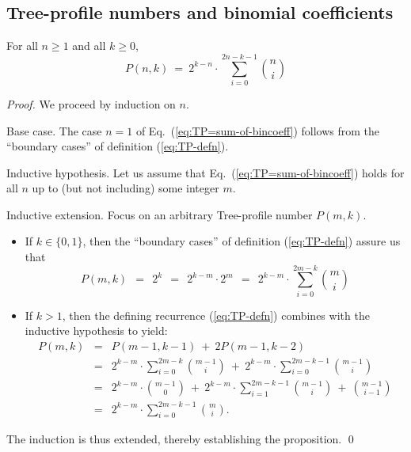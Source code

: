 \subsection{Tree-profile numbers and binomial coefficients}

\begin{prop}
\label{thm:TP=sum-of-bincoeff}
For all $n \geq 1$ and all $k \geq 0$,
\begin{equation}
\label{eq:TP=sum-of-bincoeff}
P(n,k) \ = \ 2^{k-n} \cdot \sum_{i=0}^{2n-k-1} {n \choose i}
\end{equation}
\end{prop}

\begin{proof}
We proceed by induction on $n$.

\medskip

\noindent
{\sf Base case.}
The case $n=1$ of Eq.~(\ref{eq:TP=sum-of-bincoeff}) follows from the ``boundary cases'' of definition (\ref{eq:TP-defn}).

\medskip

\noindent
{\sf Inductive hypothesis.}
Let us assume that Eq.~(\ref{eq:TP=sum-of-bincoeff}) holds for all $n$ up to (but not including) some integer $m$.  

\noindent
{\sf Inductive extension}.
Focus on an arbitrary Tree-profile number $P(m,k)$.
\begin{itemize}
\item
If $k \in \{0,1\}$, then the ``boundary cases'' of definition (\ref{eq:TP-defn}) assure us that
\[
P(m,k) \ \ = \ \ 2^k \ \ = \ \ 2^{k-m} \cdot 2^m \ \ = \ \  2^{k-m} \cdot \sum_{i=0}^{2m-k} {m \choose i}
\]

\item
If $k > 1$, then the defining recurrence (\ref{eq:TP-defn}) combines with the inductive hypothesis to yield:
\begin{eqnarray*}
\nonumber
P(m, k) & = &
   P(m-1, k-1) \ + \ 2 P(m-1, k-2) \\
        & = &
   2^{k-m} \cdot \sum_{i=0}^{2m-k} {m-1 \choose i}
   \ + \
   2^{k-m} \cdot \sum_{i=0}^{2m-k-1} {m-1 \choose i} \\
        & = &
   2^{k-m} \cdot {m-1 \choose 0}
   \ + \
   2^{k-m} \cdot \sum_{i=1}^{2m-k-1} {m-1 \choose i}
   \ + \
   {{m-1} \choose {i-1}} \\
        & = &
   2^{k-m} \cdot \sum_{i=0}^{2m-k-1} {m \choose i}.
\end{eqnarray*}
\end{itemize}
The induction is thus extended, thereby establishing the proposition.
\qed
\end{proof}

